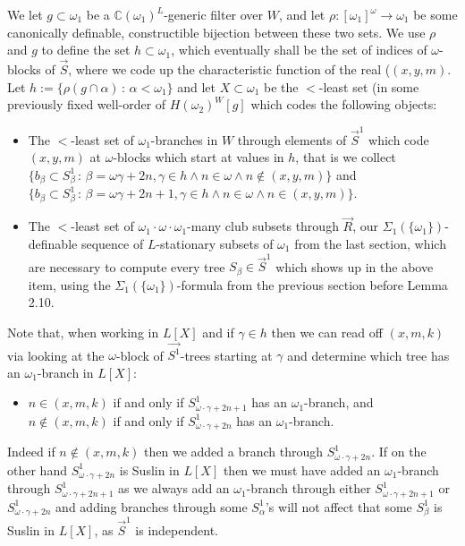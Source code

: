 \documentclass[a4paper,11pt]{article}
\begin{document}
 
We let $g \subset \omega_1$ be a $\mathbb{C} (\omega_1)^L$-generic filter over $W$, and let $\rho: [\omega_1]^{\omega} \rightarrow \omega_1$ be some canonically definable, constructible bijection between
these two sets. We use $\rho$ and $g$ to define the set $h \subset \omega_1$, which eventually shall be the set of indices of $\omega$-blocks of $\vec{S}$, where we code up the characteristic function of the real ($(x,y,m)$. Let $h:= \{\rho( g \cap \alpha) \,: \, \alpha < \omega_1 \}$ and let $X \subset \omega_1$ be the $<$-least set  (in some previously fixed well-order of $H(\omega_2)^W[g]$ which codes the following objects:
\begin{itemize}
\item The $<$-least set of $\omega_1$-branches in $W$ through elements of $\vec{S}^1$ which code $(x,y,m)$ at $\omega$-blocks which start at values in $h$, that is  we collect $\{ b_{\beta} \subset S^1_{\beta} \, : \, \beta= \omega \gamma + 2n, \gamma \in h \land n \in \omega \land n \notin (x,y,m) \}$ and  $\{ b_{\beta} \subset S^1_{\beta} \, : \, \beta= \omega \gamma + 2n+1, \gamma \in h \land n \in \omega \land n \in (x,y,m) \}$.
\item The $<$-least set of $\omega_1 \cdot \omega \cdot \omega_1$-many club subsets through $\vec{R}$, our $\Sigma_1 (\{\omega_1\})$-definable sequence of $L$-stationary subsets of $\omega_1$ from the last section, which are necessary to compute every tree $S_{\beta} \in \vec{S}^1$ which shows up in the above item, using the $\Sigma_1 (\{\omega_1\})$-formula from the previous section before Lemma 2.10.
\end{itemize}

Note that, when working in $L[X]$ and if $\gamma \in h$ then
 we can read off $(x,m,k)$  via looking at the $\omega$-block of $\vec{S^1}$-trees starting at $\gamma$ and determine which tree has an $\omega_1$-branch in $L[X]$:
\begin{itemize}
 \item[$(\ast)$]  $n \in (x,m,k)$ if and only if $S^1_{\omega \cdot \gamma +2n+1}$ has an $\omega_1$-branch, and $n \notin (x,m,k)$ if and only if $S^1_{\omega \cdot \gamma +2n}$ has an $\omega_1$-branch.
\end{itemize}
Indeed if $n \notin (x,m,k)$ then we added a branch through $S^1_{\omega \cdot \gamma+ 2n}$. If on the other hand $S^1_{\omega \cdot\gamma +2n}$ is 
Suslin in $L[X]$ then we must have added an $\omega_1$-branch through $S^1_{\omega \cdot \gamma +2n+1}$ as we always add an $\omega_1$-branch through either $S^1_{\omega \cdot \gamma +2n+1}$ or $S^1_{\omega \cdot \gamma +2n}$ and adding branches through some $S^1_{\alpha}$'s  will not affect that some $S^1_{\beta}$ is Suslin in $L[X]$, as $\vec{S}^1$ is independent.
\end{document}
